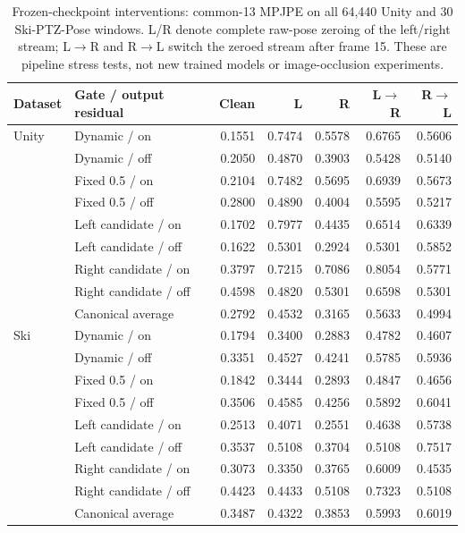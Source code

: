 \begin{table}[htbp]
\centering
\caption{Frozen-checkpoint interventions: common-13 MPJPE on all 64,440 Unity and 30 Ski-PTZ-Pose windows. L/R denote complete raw-pose zeroing of the left/right stream; L$\to$R and R$\to$L switch the zeroed stream after frame 15. These are pipeline stress tests, not new trained models or image-occlusion experiments.}
\label{tab:gate_frozen_interventions}
\footnotesize
\setlength{\tabcolsep}{4pt}
\begin{tabular}{llrrrrr}
\toprule
Dataset & Gate / output residual & Clean & L & R & L$\to$R & R$\to$L \\
\midrule
Unity & Dynamic / on & 0.1551 & 0.7474 & 0.5578 & 0.6765 & 0.5606 \\
 & Dynamic / off & 0.2050 & 0.4870 & 0.3903 & 0.5428 & 0.5140 \\
 & Fixed 0.5 / on & 0.2104 & 0.7482 & 0.5695 & 0.6939 & 0.5673 \\
 & Fixed 0.5 / off & 0.2800 & 0.4890 & 0.4004 & 0.5595 & 0.5217 \\
 & Left candidate / on & 0.1702 & 0.7977 & 0.4435 & 0.6514 & 0.6339 \\
 & Left candidate / off & 0.1622 & 0.5301 & 0.2924 & 0.5301 & 0.5852 \\
 & Right candidate / on & 0.3797 & 0.7215 & 0.7086 & 0.8054 & 0.5771 \\
 & Right candidate / off & 0.4598 & 0.4820 & 0.5301 & 0.6598 & 0.5301 \\
 & Canonical average & 0.2792 & 0.4532 & 0.3165 & 0.5633 & 0.4994 \\
\midrule
Ski & Dynamic / on & 0.1794 & 0.3400 & 0.2883 & 0.4782 & 0.4607 \\
 & Dynamic / off & 0.3351 & 0.4527 & 0.4241 & 0.5785 & 0.5936 \\
 & Fixed 0.5 / on & 0.1842 & 0.3444 & 0.2893 & 0.4847 & 0.4656 \\
 & Fixed 0.5 / off & 0.3506 & 0.4585 & 0.4256 & 0.5892 & 0.6041 \\
 & Left candidate / on & 0.2513 & 0.4071 & 0.2551 & 0.4638 & 0.5738 \\
 & Left candidate / off & 0.3537 & 0.5108 & 0.3704 & 0.5108 & 0.7517 \\
 & Right candidate / on & 0.3073 & 0.3350 & 0.3765 & 0.6009 & 0.4535 \\
 & Right candidate / off & 0.4423 & 0.4433 & 0.5108 & 0.7323 & 0.5108 \\
 & Canonical average & 0.3487 & 0.4322 & 0.3853 & 0.5993 & 0.6019 \\
\bottomrule
\end{tabular}
\end{table}
